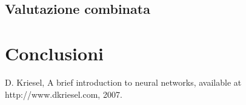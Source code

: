 \documentclass[a4paper,12pt]{report}
\begin{document}
\section{Valutazione combinata}

% 
% 
\chapter{Conclusioni}
\label{cap4}

%
%
\begin{thebibliography}{00}
%
%
D. Kriesel, A brief introduction to neural networks, available at http://www.dkriesel.com, 2007. %
%

\end{thebibliography}
% 
\end{document}

